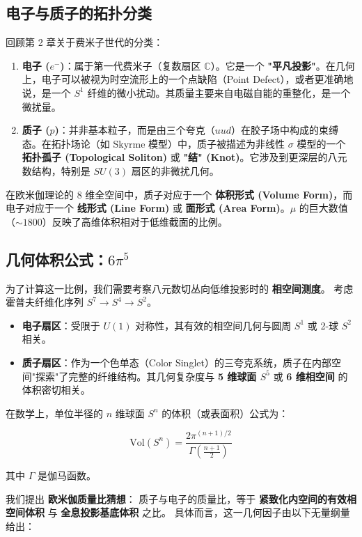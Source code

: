 \subsection{电子与质子的拓扑分类}

回顾第 2 章关于费米子世代的分类：

\begin{enumerate}
\item \textbf{电子 ($e^-$)}：属于第一代费米子（复数扇区 $\mathbb{C}$）。它是一个 \textbf{"平凡投影"}。在几何上，电子可以被视为时空流形上的一个点缺陷（Point Defect），或者更准确地说，是一个 $S^1$ 纤维的微小扰动。其质量主要来自电磁自能的重整化，是一个微扰量。
\item \textbf{质子 ($p$)}：并非基本粒子，而是由三个夸克（$uud$）在胶子场中构成的束缚态。在拓扑场论（如 Skyrme 模型）中，质子被描述为非线性 $\sigma$ 模型的一个 \textbf{拓扑孤子 (Topological Soliton)} 或 \textbf{"结" (Knot)}。它涉及到更深层的八元数结构，特别是 $SU(3)$ 扇区的非微扰几何。
\end{enumerate}

在欧米伽理论的 8 维全空间中，质子对应于一个 \textbf{体积形式 (Volume Form)}，而电子对应于一个 \textbf{线形式 (Line Form)} 或 \textbf{面形式 (Area Form)}。$\mu$ 的巨大数值（$\sim 1800$）反映了高维体积相对于低维截面的比例。

\subsection{几何体积公式：$6\pi^5$}

为了计算这一比例，我们需要考察八元数切丛向低维投影时的 \textbf{相空间测度}。
考虑霍普夫纤维化序列 $S^7 \to S^4 \to S^2$。

\begin{itemize}
\item \textbf{电子扇区}：受限于 $U(1)$ 对称性，其有效的相空间几何与圆周 $S^1$ 或 2-球 $S^2$ 相关。
\item \textbf{质子扇区}：作为一个色单态（Color Singlet）的三夸克系统，质子在内部空间"探索"了完整的纤维结构。其几何复杂度与 \textbf{5 维球面 $S^5$} 或 \textbf{6 维相空间} 的体积密切相关。
\end{itemize}

在数学上，单位半径的 $n$ 维球面 $S^n$ 的体积（或表面积）公式为：

\[\text{Vol}(S^n) = \frac{2\pi^{(n+1)/2}}{\Gamma(\frac{n+1}{2})}\]

其中 $\Gamma$ 是伽马函数。

我们提出 \textbf{欧米伽质量比猜想}：
质子与电子的质量比，等于 \textbf{紧致化内空间的有效相空间体积} 与 \textbf{全息投影基底体积} 之比。
具体而言，这一几何因子由以下无量纲量给出：

